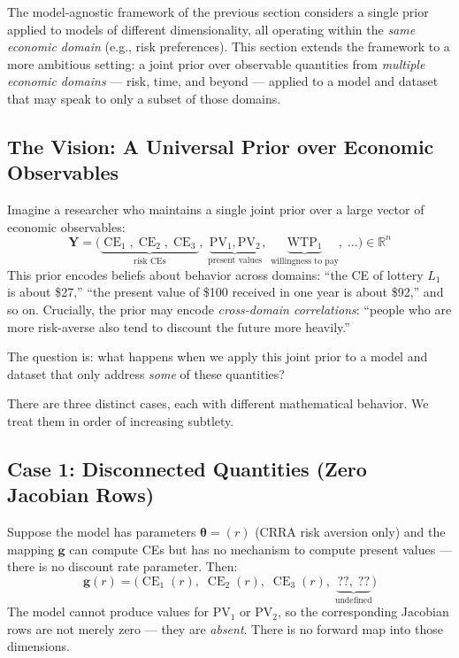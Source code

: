 \documentclass[11pt,a4paper]{article}
\theoremstyle{definition}
\newcommand{\btheta}{\boldsymbol{\theta}}
\DeclareMathOperator{\CE}{CE}
\begin{document}
The model-agnostic framework of the previous section considers a single prior
applied to models of different dimensionality, all operating within the
\emph{same economic domain} (e.g., risk preferences). This section extends the
framework to a more ambitious setting: a joint prior over observable quantities
from \emph{multiple economic domains} --- risk, time, and beyond --- applied to
a model and dataset that may speak to only a subset of those domains.

\subsection{The Vision: A Universal Prior over Economic Observables}

Imagine a researcher who maintains a single joint prior over a large vector of
economic observables:
\begin{equation}
    \mathbf{Y} = \big(\underbrace{\CE_1, \CE_2, \CE_3}_{\text{risk CEs}},\;
    \underbrace{\mathrm{PV}_1, \mathrm{PV}_2}_{\text{present values}},\;
    \underbrace{\mathrm{WTP}_1}_{\text{willingness to pay}},\; \ldots\big)
    \in \mathbb{R}^n
\end{equation}
This prior encodes beliefs about behavior across domains: ``the CE of lottery
$L_1$ is about \$27,'' ``the present value of \$100 received in one year is
about \$92,'' and so on. Crucially, the prior may encode \emph{cross-domain
correlations}: ``people who are more risk-averse also tend to discount the
future more heavily.''

The question is: what happens when we apply this joint prior to a model and
dataset that only address \emph{some} of these quantities?

There are three distinct cases, each with different mathematical behavior. We
treat them in order of increasing subtlety.

\subsection{Case 1: Disconnected Quantities (Zero Jacobian Rows)}

Suppose the model has parameters $\btheta = (r)$ (CRRA risk aversion only) and
the mapping $\mathbf{g}$ can compute CEs but has no mechanism to compute
present values --- there is no discount rate parameter. Then:
\begin{equation}
    \mathbf{g}(r) = \big(\CE_1(r),\; \CE_2(r),\; \CE_3(r),\;
    \underbrace{??,\; ??}_{\text{undefined}}\big)
\end{equation}
The model cannot produce values for $\mathrm{PV}_1$ or $\mathrm{PV}_2$, so
the corresponding Jacobian rows are not merely zero --- they are \emph{absent}.
There is no forward map into those dimensions.
\end{document}
